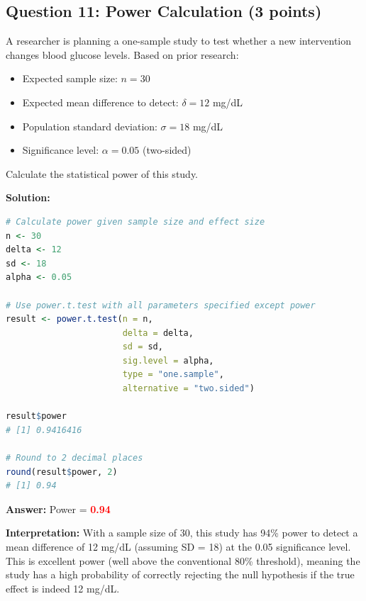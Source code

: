 \documentclass[11pt]{article}
\begin{document}
\vspace{1cm}

\subsection*{Question 11: Power Calculation (3 points)}

A researcher is planning a one-sample study to test whether a new intervention changes blood glucose levels. Based on prior research:

\begin{itemize}
\item Expected sample size: $n = 30$
\item Expected mean difference to detect: $\delta = 12$ mg/dL
\item Population standard deviation: $\sigma = 18$ mg/dL
\item Significance level: $\alpha = 0.05$ (two-sided)
\end{itemize}

Calculate the statistical power of this study.

\vspace{0.3cm}

\textbf{Solution:}

\begin{lstlisting}[language=R,basicstyle=\small\ttfamily,frame=single]
# Calculate power given sample size and effect size
n <- 30
delta <- 12
sd <- 18
alpha <- 0.05

# Use power.t.test with all parameters specified except power
result <- power.t.test(n = n,
                       delta = delta,
                       sd = sd,
                       sig.level = alpha,
                       type = "one.sample",
                       alternative = "two.sided")

result$power
# [1] 0.9416416

# Round to 2 decimal places
round(result$power, 2)
# [1] 0.94
\end{lstlisting}

\textbf{Answer:} Power = \textcolor{red}{\textbf{0.94}}

\textbf{Interpretation:} With a sample size of 30, this study has 94\% power to detect a mean difference of 12 mg/dL (assuming SD = 18) at the 0.05 significance level. This is excellent power (well above the conventional 80\% threshold), meaning the study has a high probability of correctly rejecting the null hypothesis if the true effect is indeed 12 mg/dL.
\end{document}
